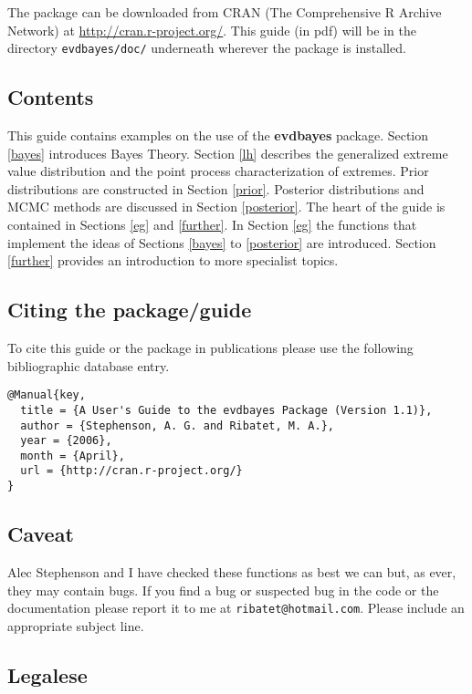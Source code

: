 \documentclass[11pt,a4paper]{article}
\begin{document}
The package can be downloaded from CRAN (The Comprehensive R Archive
Network) at \url{http://cran.r-project.org/}.  This guide (in pdf)
will be in the directory \verb+evdbayes/doc/+ underneath wherever the
package is installed.

\subsection{Contents}

This guide contains examples on the use of the \textbf{evdbayes}
package.  Section \ref{bayes} introduces Bayes Theory.  Section
\ref{lh} describes the generalized extreme value distribution and the
point process characterization of extremes.  Prior distributions are
constructed in Section \ref{prior}.  Posterior distributions and MCMC
methods are discussed in Section \ref{posterior}.  The heart of the
guide is contained in Sections \ref{eg} and \ref{further}.  In Section
\ref{eg} the functions that implement the ideas of Sections
\ref{bayes} to \ref{posterior} are introduced.  Section \ref{further}
provides an introduction to more specialist topics.

\subsection{Citing the package/guide}

To cite this guide or the package in publications please use the
following bibliographic database entry.
\begin{verbatim}
@Manual{key,
  title = {A User's Guide to the evdbayes Package (Version 1.1)},
  author = {Stephenson, A. G. and Ribatet, M. A.},
  year = {2006},
  month = {April},
  url = {http://cran.r-project.org/}
}
\end{verbatim}

\subsection{Caveat}

Alec Stephenson and I have checked these functions as best we can but,
as ever, they may contain bugs.  If you find a bug or suspected bug in
the code or the documentation please report it to me at
\verb+ribatet@hotmail.com+.  Please include an appropriate subject
line.

\subsection{Legalese}
\end{document}
